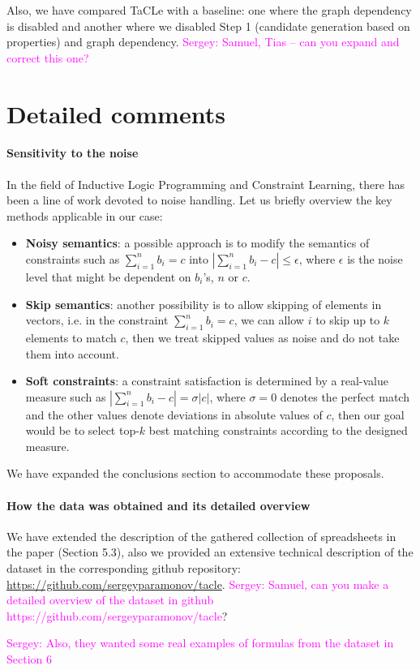 \documentclass{article}
\newcommand{\sergey}[1]{\textcolor{magenta}{{\sc Sergey:} #1}\xspace}
\begin{document}
Also, we have compared TaCLe with a baseline: one where the graph dependency is disabled and another where we disabled Step 1 (candidate generation based on properties) and graph dependency. \sergey{Samuel, Tias -- can you expand and correct this one?}

\section{Detailed comments}

\paragraph{Sensitivity to the noise}
In the field of Inductive Logic Programming and Constraint Learning, there has been a line of work devoted to noise handling. Let us briefly overview the key methods applicable in our case:
\begin{itemize}
  \item \textbf{Noisy semantics}: a possible approach is to modify the semantics of constraints such as $\sum_{i=1}^n b_i = c$ into $|\sum_{i=1}^n b_i - c| \leq \epsilon$, where $\epsilon$ is the noise level that might be dependent on $b_i$'s, $n$ or $c$.
  \item \textbf{Skip semantics}: another possibility is to allow skipping of elements in vectors, i.e. in the constraint  $\sum_{i=1}^n b_i = c$, we can allow $i$ to skip up to $k$ elements to match $c$, then we treat skipped values as noise and do not take them into account.
  \item \textbf{Soft constraints}: a constraint satisfaction is determined by a real-value measure such as $|\sum_{i=1}^n b_i - c | = \sigma|c|$, where $\sigma=0$ denotes the perfect match and the other values denote deviations in absolute values of $c$, then our goal would be to select top-$k$ best matching constraints according to the designed measure.
\end{itemize}

We have expanded the conclusions section to accommodate these proposals.


\paragraph{How the data was obtained and its detailed overview}
We have extended the description of the gathered collection of spreadsheets in the paper (Section 5.3), also we provided an extensive technical description of the dataset in the corresponding github repository: \url{https://github.com/sergeyparamonov/tacle}.
\sergey{Samuel, can you make a detailed overview of the dataset in github https://github.com/sergeyparamonov/tacle}?

\sergey{Also, they wanted some real examples of formulas from the dataset in Section 6}
\end{document}
